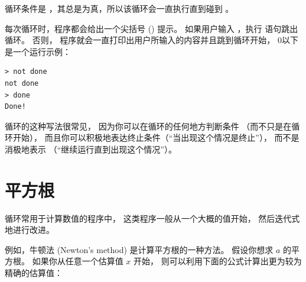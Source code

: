 循环条件是 ，其总是为真，所以该循环会一直执行直到碰到 。


每次循环时，程序都会给出一个尖括号 (\li{>}) 提示。 如果用户输入 ，执行  语句跳出循环。 否则， 程序就会一直打印出用户所输入的内容并且跳到循环开始， 0以下是一个运行示例：


\begin{lstlisting}
> not done
not done
> done
Done!
\end{lstlisting}

%

 循环的这种写法很常见， 因为你可以在循环的任何地方判断条件
（而不只是在循环开始）， 而且你可以积极地表达终止条件（``当出现这个情况是终止''）， 而不是消极地表示 （``继续运行直到出现这个情况''）。


\section{平方根}
\label{squareroot}


循环常用于计算数值的程序中， 这类程序一般从一个大概的值开始， 然后迭代式地进行改进。 


例如，牛顿法 (Newton's method) 是计算平方根的一种方法。 假设你想求 $a$ 的平方根。 如果你从任意一个估算值 $x$ 开始， 则可以利用下面的公式计算出更为较为精确的估算值：

